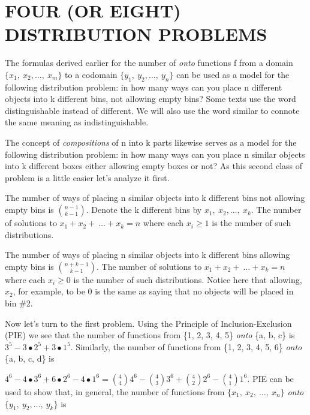 



\section{FOUR (OR EIGHT) DISTRIBUTION PROBLEMS}

The formulas derived earlier for the number of \emph{onto} functions f
from a domain \(\{ x_{1},\ x_{2},\ldots,\ x_{m}\}\) to a codomain
\(\{ y_{1},\ y_{2},\ldots,\ y_{n}\}\) can be used as a model for the
following distribution problem: in how many ways can you place n
different objects into k different bins, not allowing empty bins? Some
texts use the word distinguishable instead of different. We will also
use the word similar to connote the same meaning as indistinguishable.

The concept of \emph{compositions} of n into k parts likewise serves as
a model for the following distribution problem: in how many ways can you
place n similar objects into k different boxes either allowing empty
boxes or not? As this second class of problem is a little easier let's
analyze it first.

\begin{theorem} The number of ways of placing n similar objects into k different
bins not allowing empty bins is \(\binom{n - 1}{k - 1}
\). Denote the k different bins by
\(x_{1},\ x_{2},\ldots,\ x_{k}\). The number of solutions to
\(x_{1} + x_{2} + \ \ldots + x_{k} = n\) where each \(x_{i} \geq 1\) is
the number of such distributions.
\end{theorem}

\begin{theorem}  The number of ways of placing n similar objects into k different
  bins allowing empty bins is \(\binom{n + k - 1}{k - 1}
  \). The number of solutions to
  \(x_{1} + x_{2} + \ \ldots + x_{k} = n\) where each \(x_{i} \geq 0\) is
  the number of such distributions. Notice here that allowing, \(x_{2}\),
  for example, to be 0 is the same as saying that no objects will be
  placed in bin \#2.
\end{theorem}

Now let's turn to the first problem. Using the Principle of
Inclusion-Exclusion (PIE) we see that the number of functions from \{1,
2, 3, 4, 5\} \emph{onto} \{a, b, c\} is
\(3^{5} - 3 \bullet 2^{5} + 3 \bullet 1^{5}\). Similarly, the number of
functions from \{1, 2, 3, 4, 5, 6\} \emph{onto} \{a, b, c, d\} is

\(4^{6} - 4 \bullet 3^{6} + 6 \bullet 2^{6} - 4 \bullet 1^{6} =
\binom{4}{4}
4^{6} -
\binom{4}{3}
3^{6} +
\binom{4}{2}
2^{6} -
\binom{4}{1}
1^{6}.\) PIE can be used to show that, in general, the
number of functions from \(\{ x_{1},\ x_{2},\ \ldots,\ x_{n}\}\)
\emph{onto} \(\{ y_{1},\ y_{2},\ldots,\ y_{k}\}\) is

